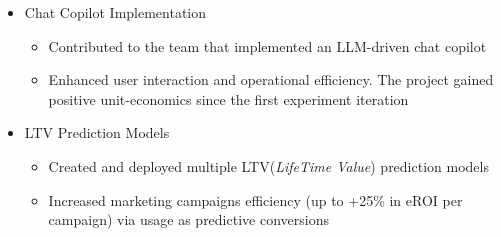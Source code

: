\documentclass[a4paper,12pt]{memoir} %
\begin{document}
{\begin{itemize}
\begin{itemize}
		\item Boosted conversion rates by 15\%.
	\end{itemize}
	\item Chat Copilot Implementation
	\begin{itemize}
		\item Contributed to the team that implemented an LLM-driven chat copilot
		\item Enhanced user interaction and operational efficiency. The project gained positive unit-economics since the first experiment iteration
	\end{itemize}
	\item LTV Prediction Models
	\begin{itemize}
		\item Created and deployed multiple LTV(\textit{LifeTime Value}) prediction models
		\item Increased marketing campaigns efficiency (up to +25\% in eROI per campaign)
			via usage as predictive conversions
	\end{itemize}
\end{itemize}
}


\Sep %



\clearpage %

\userinformation %

\framebreak %

\end{document}
